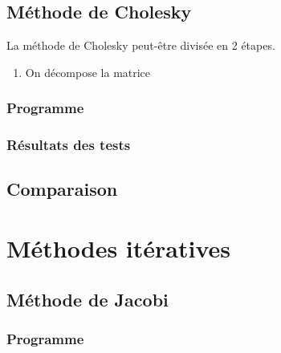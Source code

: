 \documentclass{report}
\begin{document}
        
    \newpage
    \section{Méthode de Cholesky}
      La méthode de Cholesky peut-être divisée en 2 étapes.
      \begin{enumerate}
        \item{On décompose la matrice}
      \end{enumerate}
      \subsection{Programme}
        
      \newpage
      \subsection{Résultats des tests}
      	
    \newpage
    \section{Comparaison}
    \newpage
     
  \chapter{Méthodes itératives}
  	\section{Méthode de Jacobi}
  	  \subsection{Programme}
        
      \newpage
\end{document}
